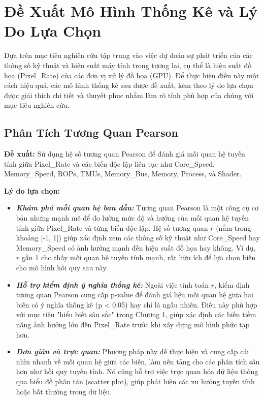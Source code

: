 \section{Đề Xuất Mô Hình Thống Kê và Lý Do Lựa Chọn}

Dựa trên mục tiêu nghiên cứu tập trung vào việc dự đoán sự phát triển của các thông số kỹ thuật và hiệu suất máy tính trong tương lai, cụ thể là hiệu suất đồ họa (Pixel\_Rate) của các đơn vị xử lý đồ họa (GPU). Để thực hiện điều này một cách hiệu quả, các mô hình thống kê sau được đề xuất, kèm theo lý do lựa chọn được giải thích chi tiết và thuyết phục nhằm làm rõ tính phù hợp của chúng với mục tiêu nghiên cứu.

\subsection{Phân Tích Tương Quan Pearson}

\textbf{Đề xuất:} Sử dụng hệ số tương quan Pearson để đánh giá mối quan hệ tuyến tính giữa Pixel\_Rate và các biến độc lập liên tục như Core\_Speed, Memory\_Speed, ROPs, TMUs, Memory\_Bus, Memory, Process, và Shader.

\textbf{Lý do lựa chọn:}

\begin{itemize}
    \item \textbf{\textit{Khám phá mối quan hệ ban đầu:}} Tương quan Pearson là một công cụ cơ bản nhưng mạnh mẽ để đo lường mức độ và hướng của mối quan hệ tuyến tính giữa Pixel\_Rate và từng biến độc lập. Hệ số tương quan $  r  $ (nằm trong khoảng [-1, 1]) giúp xác định xem các thông số kỹ thuật như Core\_Speed hay Memory\_Speed có ảnh hưởng mạnh đến hiệu suất đồ họa hay không. Ví dụ, $  r  $ gần 1 cho thấy mối quan hệ tuyến tính mạnh, rất hữu ích để lựa chọn biến cho mô hình hồi quy sau này.
    \item \textbf{\textit{Hỗ trợ kiểm định ý nghĩa thống kê:}} Ngoài việc tính toán $  r  $, kiểm định tương quan Pearson cung cấp p-value để đánh giá liệu mối quan hệ giữa hai biến có ý nghĩa thống kê (p < 0.05) hay chỉ là ngẫu nhiên. Điều này phù hợp với mục tiêu "hiểu biết sâu sắc" trong Chương 1, giúp xác định các biến tiềm năng ảnh hưởng lớn đến Pixel\_Rate trước khi xây dựng mô hình phức tạp hơn.
    \item \textbf{\textit{Đơn giản và trực quan:}} Phương pháp này dễ thực hiện và cung cấp cái nhìn nhanh về mối quan hệ giữa các biến, làm nền tảng cho các phân tích sâu hơn như hồi quy tuyến tính. Nó cũng hỗ trợ việc trực quan hóa dữ liệu thông qua biểu đồ phân tán (scatter plot), giúp phát hiện các xu hướng tuyến tính hoặc bất thường trong dữ liệu.
\end{itemize}

